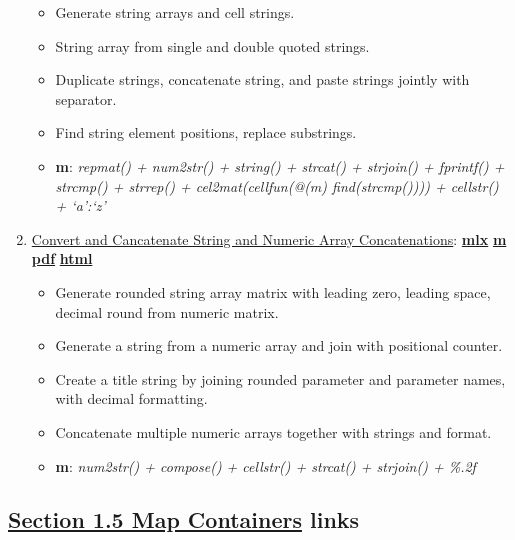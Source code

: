 \documentclass[
]{book}
\providecommand{\tightlist}{%
  \setlength{\itemsep}{0pt}\setlength{\parskip}{0pt}}
\begin{document}
\begin{enumerate}
  \begin{itemize}
  \tightlist
  \item
    Generate string arrays and cell strings.
  \item
    String array from single and double quoted strings.
  \item
    Duplicate strings, concatenate string, and paste strings jointly with separator.
  \item
    Find string element positions, replace substrings.
  \item
    \textbf{m}: \emph{repmat() + num2str() + string() + strcat() + strjoin() + fprintf() + strcmp() + strrep() + cel2mat(cellfun(@(m) find(strcmp()))) + cellstr() + `a':`z'}
  \end{itemize}
\item
  \href{https://fanwangecon.github.io/M4Econ/amto/string/htmlpdfm/fs_string_strcat.html}{Convert and Cancatenate String and Numeric Array Concatenations}: \href{https://github.com/FanWangEcon/M4Econ/blob/master/amto/string/fs_string_strcat.mlx}{\textbf{mlx}} \textbar{} \href{https://github.com/FanWangEcon/M4Econ/blob/master/amto/string/htmlpdfm/fs_string_strcat.m}{\textbf{m}} \textbar{} \href{https://github.com/FanWangEcon/M4Econ/blob/master/amto/string/htmlpdfm/fs_string_strcat.pdf}{\textbf{pdf}} \textbar{} \href{https://fanwangecon.github.io/M4Econ/amto/string/htmlpdfm/fs_string_strcat.html}{\textbf{html}}

  \begin{itemize}
  \tightlist
  \item
    Generate rounded string array matrix with leading zero, leading space, decimal round from numeric matrix.
  \item
    Generate a string from a numeric array and join with positional counter.
  \item
    Create a title string by joining rounded parameter and parameter names, with decimal formatting.
  \item
    Concatenate multiple numeric arrays together with strings and format.
  \item
    \textbf{m}: \emph{num2str() + compose() + cellstr() + strcat() + strjoin() + \%.2f}
  \end{itemize}
\end{enumerate}

\hypertarget{section-1.5-map-containersmap-containers-links}{%
\subsection{\texorpdfstring{\protect\hyperlink{map-containers}{Section 1.5 Map Containers} links}{Section 1.5 Map Containers links}}\label{section-1.5-map-containersmap-containers-links}}
\end{document}
